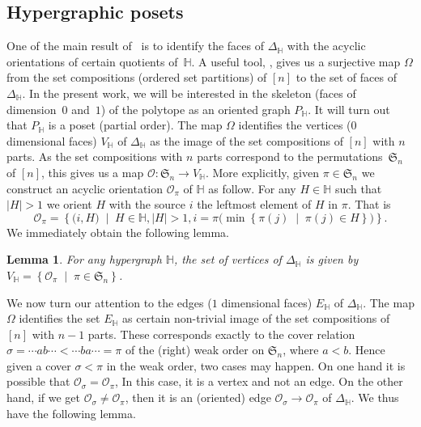 \documentclass[reqno]{amsart}
\newtheorem{lemma}[theorem]{Lemma}
\theoremstyle{definition}
\newcommand{\set}[2]{\left\{ #1 \;\middle|\; #2 \right\}} %
\newcommand{\vincent}[1]{\todo[color=blue!30]{#1 \\ \hfill --- V.}}
\newcommand{\fS}{\mathfrak{S}} %
\newcommand{\Or}{\mathcal O}  %
\newcommand{\HH}{\mathbb H}  %
\begin{document}

\subsection{Hypergraphic posets} 
\label{subsec:P_H}

One of the main result of~\cite[Thm.~3.18]{BenBerMac} is to identify the faces of $\Delta_\HH$ with the acyclic orientations of certain quotients of~$\HH$.
A useful tool, \cite[Lem.~2.9]{BenBerMac}, gives us a surjective map $\Omega$ from the set compositions (ordered set partitions) of $[n]$ to the set of faces of $\Delta_\HH$.
In the present work, we will be interested in the skeleton (faces of dimension~$0$ and~$1$) of the polytope as an oriented graph $P_{\HH}$.
It will turn out that $P_{\HH}$ is a poset (partial order).
The map $\Omega$ identifies the vertices ($0$ dimensional faces) $V_{\HH}$  of $\Delta_{\HH}$ as the image of the set compositions of $[n]$ with $n$ parts.
As the set compositions with $n$ parts correspond to the permutations~$\fS_n$ of $[n]$, this gives us a map $\Or \colon \fS_n \to V_{\HH}$.
More explicitly, given $\pi\in\fS_n$ we construct an acyclic orientation $\Or_\pi$ of $\HH$ as follow. For any $H\in \HH$ such that $|H|>1$ we orient $H$  with the source $i$  the leftmost element of $H$ in $\pi$.
That is
\begin{equation}\label{eq:orientation}
	\Or_\pi = \set{\big(i,H\big)}{H\in \HH, |H|>1, i = \pi\big(\min\set{\pi(j)}{\pi(j)\in H}\big)}.
\end{equation}
\vincent{hum... I would write $\pi\big(\min\set{j}{\pi(j)\in H}\big)$???}
We immediately obtain the following lemma.

\begin{lemma}\label{lem:Hvertices}
For any hypergraph $\HH$, the set of vertices of $\Delta_{\HH}$ is given by $V_{\HH}=\set{\Or_\pi}{\pi \in \fS_n}$.
\end{lemma}

We now turn our attention to the edges ($1$ dimensional faces) $E_{\HH}$ of $\Delta_{\HH}$. The map $\Omega$ identifies the set $E_{\HH}$ as certain non-trivial image of the set compositions of $[n]$ with $n-1$ parts.
These corresponds  exactly to the cover relation $\sigma=\cdots ab \cdots < \cdots ba\cdots =\pi$ of the (right) weak order on $\fS_n$, where $a<b$. 
Hence given a cover $\sigma < \pi$ in the weak  order, two cases may happen. On one hand it is possible that $\Or_\sigma=\Or_\pi$, In this case, it is a vertex and not an edge. On the other hand, if we get 
 $\Or_\sigma\ne \Or_\pi$, then it is an (oriented) edge $\Or_\sigma\to\Or_\pi$ of $\Delta_{\HH}$. We thus have the following lemma.
\end{document}
